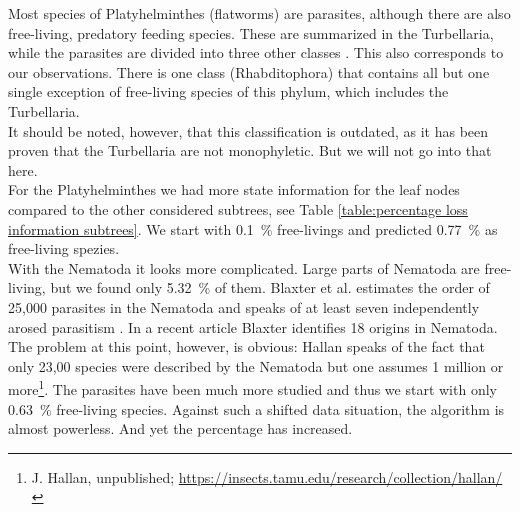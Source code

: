       Most species of Platyhelminthes (flatworms) are parasites, although there are also free-living, 
        predatory feeding species. These are summarized in the Turbellaria, while the parasites are 
        divided into three other classes \cite{Ax1961}. This also corresponds to our observations. There 
        is one class (Rhabditophora) that contains all but one single exception of free-living species 
        of this phylum, which includes the Turbellaria. \\
      It should be noted, however, that this classification is outdated, as it has been proven that 
        the Turbellaria are not monophyletic. But we will not go into that here. \\
      For the Platyhelminthes we had more state information for the leaf nodes compared to the other 
        considered subtrees, see Table \ref{table:percentage loss information subtrees}. We start with 
        0.1~\% free-livings and predicted 0.77~\% as free-living spezies. \\

      With the Nematoda it looks more complicated. Large parts of Nematoda are free-living, but we 
        found only 5.32~\% of them. Blaxter et al. estimates the order of 25,000 parasites in the 
        Nematoda \cite{Blaxter2015} and speaks of at least seven independently arosed parasitism 
        \cite{Blaxter1998}. In a recent article Blaxter identifies 18 origins \cite{Blaxter2015} in 
        Nematoda. \\
      The problem at this point, however, is obvious: Hallan speaks of the fact that only 23,00 species 
        were described by the Nematoda but one assumes 1 million or more\footnote{J. Hallan, unpublished; 
          \hyperlink{https://insects.tamu.edu/research/collection/hallan/}
          {https://insects.tamu.edu/research/collection/hallan/}
        }.  The parasites have been much more studied and thus we start 
        with only 0.63~\% free-living species. Against such a shifted data situation, the algorithm is 
        almost powerless. And yet the percentage has increased. \\



